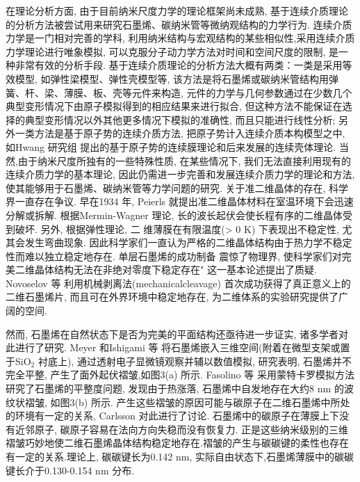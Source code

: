 \documentclass{APS}
\begin{document}
\begin{bicol}
在理论分析方面, 由于目前纳米尺度力学的理论框架尚未成熟, 基于连续介质理论的分析方法被尝试用来研究石墨烯、碳纳米管等微纳观结构的力学行为. 连续介质力学是一门相对完善的学科, 利用纳米结构与宏观结构的某些相似性,采用连续介质力学理论进行唯象模拟, 可以克服分子动力学方法对时间和空间尺度的限制, 是一种非常有效的分析手段. 基于连续介质理论的分析方法大概有两类：一类是采用等效模型, 如弹性梁模型、弹性壳模型等, 该方法是将石墨烯或碳纳米管结构用弹簧、杆、梁、薄膜、板、壳等元件来构造, 元件的力学与几何参数通过在少数几个典型变形情况下由原子模拟得到的相应结果来进行拟合, 但这种方法不能保证在选择的典型变形情况以外其他更多情况下模拟的准确性, 而且只能进行线性分析; 另外一类方法是基于原子势的连续介质方法, 把原子势计入连续介质本构模型之中, 如Hwang 研究组 提出的基于原子势的连续膜理论和后来发展的连续壳体理论. 当然,由于纳米尺度所独有的一些特殊性质, 在某些情况下, 我们无法直接利用现有的连续介质力学的基本理论, 因此仍需进一步完善和发展连续介质力学的理论和方法, 使其能够用于石墨烯、碳纳米管等力学问题的研究.
关于准二维晶体的存在, 科学界一直存在争议. 早在1934 年, Peierls 就提出准二维晶体材料在室温环境下会迅速分解或拆解. 根据Mermin-Wagner 理论, 长的波长起伏会使长程有序的二维晶体受到破坏. 另外, 根据弹性理论, 二
维薄膜在有限温度(> 0 K) 下表现出不稳定性, 尤其会发生弯曲现象. 因此科学家们一直认为严格的二维晶体结构由于热力学不稳定性而难以独立稳定地存在. 单层石墨烯的成功制备 震惊了物理界, 使科学家们对完美二维晶体结构无法在非绝对零度下稳定存在" 这一基本论述提出了质疑. Novoselov 等 利用机械剥离法(mechanicalcleavage) 首次成功获得了真正意义上的二维石墨烯片, 而且可在外界环境中稳定地存在, 为二维体系的实验研究提供了广阔的空间.

然而, 石墨烯在自然状态下是否为完美的平面结构还亟待进一步证实, 诸多学者对此进行了研究. Meyer 和Ishigami 等 将石墨烯嵌入三维空间(附着在微型支架或置于SiO$_2$ 衬底上), 通过透射电子显微镜观察并辅以数值模拟, 研究表明, 石墨烯并不完全平整, 产生了面外起伏褶皱,如图3(a) 所示. Fasolino 等 采用蒙特卡罗模拟方法研究了石墨烯的平整度问题, 发现由于热涨落, 石墨烯中自发地存在大约8 nm 的波纹状褶皱, 如图3(b) 所示. 产生这些褶皱的原因可能与碳原子在二维石墨烯中所处的环境有一定的关系, Carlsson 对此进行了讨论. 石墨烯中的碳原子在薄膜上下没有近邻原子, 碳原子容易在法向方向失稳而没有恢复力. 正是这些纳米级别的三维褶皱巧妙地使二维石墨烯晶体结构稳定地存在.褶皱的产生与碳碳键的柔性也存在有一定的关系.理论上, 碳碳键长为0.142 nm, 实际自由状态下,石墨烯薄膜中的碳碳键长介于0.130-0.154 nm 分布.


\end{bicol}
\end{document}
